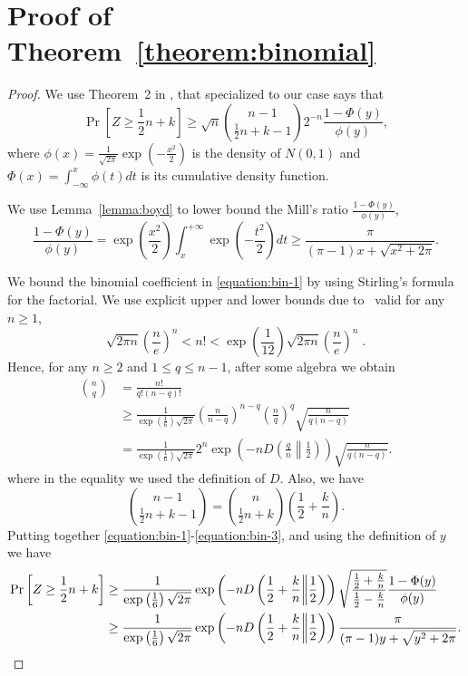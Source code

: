 \documentclass{article}
\begin{document}



\appendix

\section{Proof of Theorem~\ref{theorem:binomial}}

\begin{proof}
We use Theorem~2 in \cite{McKay1989}, that specialized to our case says that
\begin{equation}
\label{equation:bin-1}
\Pr \left[ Z \ge  \frac{1}{2} n + k  \right] \ge \sqrt{n} \binom{n-1}{ \frac{1}{2} n + k -1} 2^{-n} \frac{1 - \Phi(y)}{\phi(y)},
\end{equation}
where $\phi(x) = \frac{1}{\sqrt{2 \pi}} \exp(-\frac{x^2}{2})$ is the density of $N(0,1)$ and
$\Phi(x) = \int_{-\infty}^x \phi(t) dt$ is its cumulative density function.

We use Lemma~\ref{lemma:boyd} to lower bound the Mill's ratio $\frac{1 - \Phi(y)}{\phi(y)}$,
$$
\frac{1 - \Phi(y)}{\phi(y)}
= \exp\left(\frac{x^2}{2}\right) \int_{x}^{+\infty} \exp\left(-\frac{t^2}{2}\right) dt
\ge \frac{\pi}{(\pi-1)x+\sqrt{x^2+2 \pi}}.
$$

We bound the binomial coefficient in \eqref{equation:bin-1} by using Stirling's formula for the factorial.
We use explicit upper and lower bounds due to~\cite{Robbins-1955} valid for any $n\ge 1$,
$$
\sqrt{2 \pi n} \left( \frac{n}{e} \right)^n < n! < \exp\left(\frac{1}{12}\right) \sqrt{2 \pi n} \left( \frac{n}{e} \right)^n \; .
$$
Hence, for any $n \ge 2$ and $1\le q \le n-1$, after some algebra we obtain
\begin{align*}
\binom{n}{q}
& = \frac{n!}{q! (n-q)!} \\
& \ge \frac{1}{\exp\left(\frac{1}{6}\right) \sqrt{2 \pi}} \left(\frac{n}{n-q}\right)^{n-q} \left(\frac{n}{q}\right)^{q} \sqrt{\frac{n}{q(n-q)}} \\
& = \frac{1}{\exp\left(\frac{1}{6}\right) \sqrt{2 \pi}} 2^n \exp\left(-n D\left(\frac{q}{n} \middle\| \frac{1}{2}\right)\right) \sqrt{\frac{n}{q(n-q)}}.
\end{align*}
where in the equality we used the definition of $D$.
Also, we have
\begin{equation}
\label{equation:bin-3}
{n-1 \choose \frac{1}{2} n + k - 1} = {n \choose \frac{1}{2} n + k} \left(\frac{1}{2} + \frac{k}{n}\right) .
\end{equation}
Putting together \eqref{equation:bin-1}-\eqref{equation:bin-3}, and using the definition of $y$ we have
\begin{align*}
\Pr\left[ Z \ge \frac{1}{2} n + k \right]
& \ge \frac{1}{\exp\left(\frac{1}{6}\right) \sqrt{2 \pi}} \exp\left(-n D\left(\frac{1}{2}+\frac{k}{n} \middle\| \frac{1}{2}\right)\right) \sqrt{\frac{\frac{1}{2} + \frac{k}{n}}{\frac{1}{2}-\frac{k}{n}}}  \frac{1 - \Phi(y)}{\phi(y)} \\
& \ge \frac{1}{\exp\left(\frac{1}{6}\right) \sqrt{2 \pi}} \exp\left(-n D\left(\frac{1}{2}+\frac{k}{n} \middle\| \frac{1}{2}\right)\right) \frac{\pi}{(\pi-1)y+\sqrt{y^2+2 \pi}}. \qedhere
\end{align*}
\end{proof}
\end{document}
